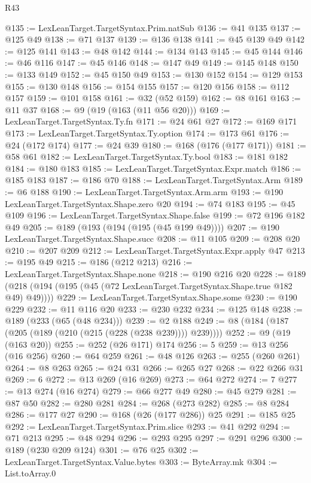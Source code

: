 \begin{lexlean}{R43}
\begin{coremodule}
@135 := LexLeanTarget.TargetSyntax.Prim.natSub
@136 := @41 @135
@137 := @125 @49
@138 := @71 @137
@139 := @136 @138
@141 := @45 @139 @49
@142 := @125 @141
@143 := @48 @142
@144 := @134 @143
@145 := @45 @144
@146 := @46 @116
@147 := @45 @146
@148 := @147 @49
@149 := @145 @148
@150 := @133 @149
@152 := @45 @150 @49
@153 := @130 @152
@154 := @129 @153
@155 := @130 @148
@156 := @154 @155
@157 := @120 @156
@158 := @112 @157
@159 := @101 @158
@161 := @32 (@52 @159)
@162 := @8 @161
@163 := @11 @37
@168 := @9 (@19 (@163 (@11 @56 @20)))
@169 := LexLeanTarget.TargetSyntax.Ty.fn
@171 := @24 @61 @27
@172 := @169 @171
@173 := LexLeanTarget.TargetSyntax.Ty.option
@174 := @173 @61
@176 := @24 (@172 @174)
@177 := @24 @39
@180 := @168 (@176 (@177 @171))
@181 := @58 @61
@182 := LexLeanTarget.TargetSyntax.Ty.bool
@183 := @181 @182
@184 := @180 @183
@185 := LexLeanTarget.TargetSyntax.Expr.match
@186 := @185 @183
@187 := @186 @70
@188 := LexLeanTarget.TargetSyntax.Arm
@189 := @6 @188
@190 := LexLeanTarget.TargetSyntax.Arm.arm
@193 := @190 LexLeanTarget.TargetSyntax.Shape.zero @20
@194 := @74 @183
@195 := @45 @109
@196 := LexLeanTarget.TargetSyntax.Shape.false
@199 := @72 @196 @182 @49
@205 := @189 (@193 (@194 (@195 (@45 @199 @49))))
@207 := @190 LexLeanTarget.TargetSyntax.Shape.succ
@208 := @11 @105
@209 := @208 @20
@210 := @207 @209
@212 := LexLeanTarget.TargetSyntax.Expr.apply @47
@213 := @195 @49
@215 := @186 (@212 @213)
@216 := LexLeanTarget.TargetSyntax.Shape.none
@218 := @190 @216 @20
@228 := @189 (@218 (@194 (@195 (@45 (@72 LexLeanTarget.TargetSyntax.Shape.true @182 @49) @49))))
@229 := LexLeanTarget.TargetSyntax.Shape.some
@230 := @190 @229
@232 := @11 @116 @20
@233 := @230 @232
@234 := @125 @148
@238 := @189 (@233 (@65 (@48 @234)))
@239 := @2 @188
@249 := @8 (@184 (@187 (@205 (@189 (@210 (@215 (@228 (@238 @239)))) @239))))
@252 := @9 (@19 (@163 @20))
@255 := @252 (@26 @171) @174
@256 := 5
@259 := @13 @256 (@16 @256)
@260 := @64 @259
@261 := @48 @126
@263 := @255 (@260 @261)
@264 := @8 @263
@265 := @24 @31
@266 := @265 @27
@268 := @22 @266 @31
@269 := 6
@272 := @13 @269 (@16 @269)
@273 := @64 @272
@274 := 7
@277 := @13 @274 (@16 @274)
@279 := @66 @277 @49
@280 := @45 @279
@281 := @87 @50
@282 := @280 @281
@284 := @268 (@273 @282)
@285 := @8 @284
@286 := @177 @27
@290 := @168 (@26 (@177 @286)) @25
@291 := @185 @25
@292 := LexLeanTarget.TargetSyntax.Prim.slice
@293 := @41 @292
@294 := @71 @213
@295 := @48 @294
@296 := @293 @295
@297 := @291 @296
@300 := @189 (@230 @209 @124)
@301 := @76 @25
@302 := LexLeanTarget.TargetSyntax.Value.bytes
@303 := ByteArray.mk
@304 := List.toArray.{0}

\end{coremodule}
\end{lexlean}
